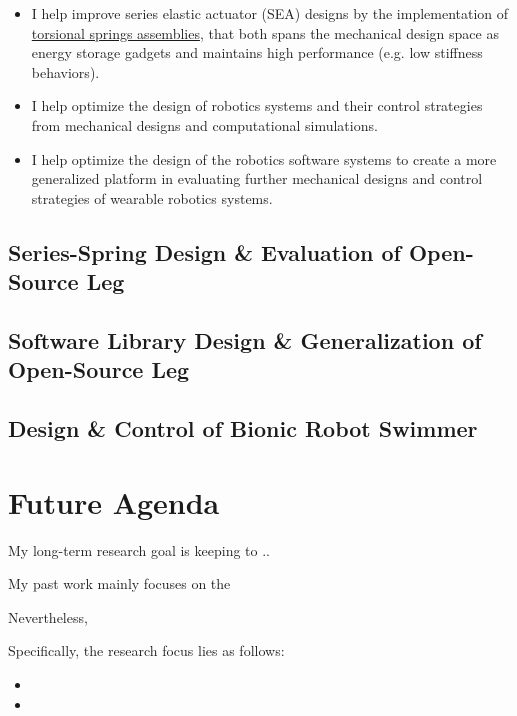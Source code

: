 \documentclass[8pt]{article}
\begin{document}
\begin{itemize}

    \item {I help improve series elastic actuator (SEA) designs by the implementation of \hyperref[sec:series-spring]{torsional springs assemblies}, that both spans the mechanical design space as energy storage gadgets and maintains high performance (e.g. low stiffness behaviors\cite{SpringDesign_OSL}).}
    
    \item {I help optimize the design of robotics systems and their control strategies from mechanical designs and computational simulations.}
    
    \item {I help optimize the design of the robotics software systems to create a more generalized platform in evaluating further mechanical designs and control strategies of wearable robotics systems.}

\end{itemize}


    \subsection{Series-Spring Design \& Evaluation of Open-Source Leg}  \label{sec:series-spring}

    \subsection{Software Library Design \& Generalization of Open-Source Leg}

    \subsection{Design \& Control of Bionic Robot Swimmer} 


\section{Future Agenda} \label{sec:Agenda}

My long-term research goal is keeping to .. 

My past work mainly focuses on the 

Nevertheless, 

Specifically, the research focus lies as follows: 

\begin{itemize}

    \item {}
    \item 
\end{itemize}



\end{document}
